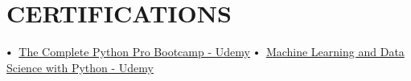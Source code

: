 \documentclass[letterpaper,11pt]{article}
\newcommand\sbullet[1][.5]{\mathbin{\vcenter{\hbox{\scalebox{#1}{$\bullet$}}}}}
\begin{document}
\section{CERTIFICATIONS}

$\sbullet[.75] \hspace{0.1cm}$ {\href{certificateLink.com}{The Complete Python Pro Bootcamp - Udemy}} \hspace{0.5cm}
$\sbullet[.75] \hspace{0.1cm}$ {\href{certificateLink.com}{Machine Learning and Data Science with Python - Udemy}} \hspace{0.5cm}


\end{document}
